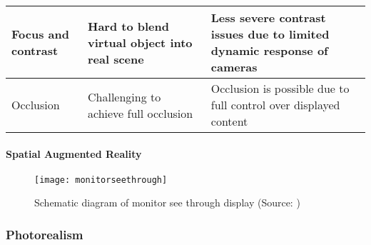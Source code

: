 \begin{table}[]
\begin{tabular}{@{}p{3.5cm}|P{4.5cm}|P{4.5cm}@{}}
\hline
Focus and contrast                         & Hard to blend virtual object into real scene                           & Less severe contrast issues due to limited dynamic response of cameras                                        \\
\hline
Occlusion                                  & Challenging to achieve full occlusion									& Occlusion is possible due to full control over displayed content \\ \bottomrule 
\end{tabular}
\end{table}

\paragraph{Spatial Augmented Reality}

\begin{figure}
	\centering
	\texttt{[image: monitorseethrough]}
	\caption{Schematic diagram of monitor see through display (Source: \cite{azuma1997survey})}
	\label{fig:monitorseethrough}
\end{figure}

\subsubsection{Photorealism}

